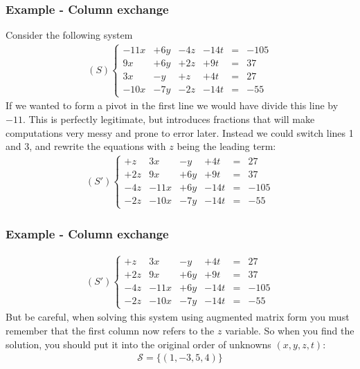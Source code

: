 \documentclass[usenames,dvipsnames,aspectratio=169,10pt]{beamer}
\numberwithin{equation}{section}
\begin{document}
\begin{frame}
\frametitle{Example - Column exchange}
Consider the following system
\begin{align*}
(S)
\left\{
\begin{matrix}
 -11x &  +6y &  -4z & -14t &=& -105 \\
   9x &  +6y &  +2z &  +9t &=&   37 \\
   3x &   -y &   +z &  +4t &=&   27 \\
 -10x &  -7y &  -2z & -14t &=&  -55
\end{matrix}
\right.
\end{align*}
If we wanted to form a pivot in the first line we would have divide this line by $-11$. This is perfectly legitimate, but introduces fractions that will make computations very messy and prone to error later. Instead we could switch lines 1 and 3, and rewrite the equations with $z$ being the leading term:
\begin{align*}
(S')
\left\{
\begin{matrix}
   +z &  3x &   -y &  +4t &=&   27 \\
  +2z &  9x &  +6y &  +9t &=&   37 \\
  -4z &-11x &  +6y & -14t &=& -105 \\
  -2z &-10x &  -7y & -14t &=&  -55
\end{matrix}
\right.
\end{align*}
\end{frame}





\begin{frame}
\frametitle{Example - Column exchange}
\begin{align*}
(S')
\left\{
\begin{matrix}
   +z &  3x &   -y &  +4t &=&   27 \\
  +2z &  9x &  +6y &  +9t &=&   37 \\
  -4z &-11x &  +6y & -14t &=& -105 \\
  -2z &-10x &  -7y & -14t &=&  -55
\end{matrix}
\right.
\end{align*}
But be careful, when solving this system using augmented matrix form you must remember that the first column now refers to the $z$ variable. So when you find the solution, you should put it into the original order of unknowns $(x,y,z,t)$:
\begin{align*}
\mathcal{S} = \{(1,-3,5,4) \}
\end{align*}

\end{frame}
\end{document}
